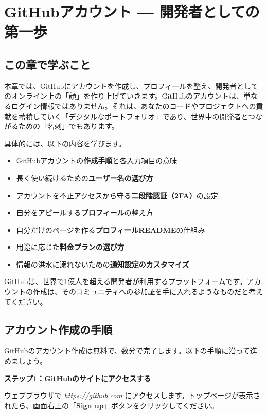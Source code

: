 \chapter{GitHubアカウント — 開発者としての第一歩}

\section{この章で学ぶこと}

本章では、GitHubにアカウントを作成し、プロフィールを整え、開発者としてのオンライン上の「顔」を作り上げていきます。GitHubのアカウントは、単なるログイン情報ではありません。それは、あなたのコードやプロジェクトへの貢献を蓄積していく「デジタルなポートフォリオ」であり、世界中の開発者とつながるための「名刺」でもあります。

具体的には、以下の内容を学びます。

\begin{itemize}
  \item GitHubアカウントの\textbf{作成手順}と各入力項目の意味
  \item 長く使い続けるための\textbf{ユーザー名の選び方}
  \item アカウントを不正アクセスから守る\textbf{二段階認証（2FA）}の設定
  \item 自分をアピールする\textbf{プロフィール}の整え方
  \item 自分だけのページを作る\textbf{プロフィールREADME}の仕組み
  \item 用途に応じた\textbf{料金プランの選び方}
  \item 情報の洪水に溺れないための\textbf{通知設定のカスタマイズ}
\end{itemize}

GitHubは、世界で1億人を超える開発者が利用するプラットフォームです。アカウントの作成は、そのコミュニティへの参加証を手に入れるようなものだと考えてください。

\section{アカウント作成の手順}

GitHubのアカウント作成は無料で、数分で完了します。以下の手順に沿って進めましょう。

\textbf{ステップ1：GitHubのサイトにアクセスする}

ウェブブラウザで \textit{https://github.com} にアクセスします。トップページが表示されたら、画面右上の「\textbf{Sign up}」ボタンをクリックしてください。

